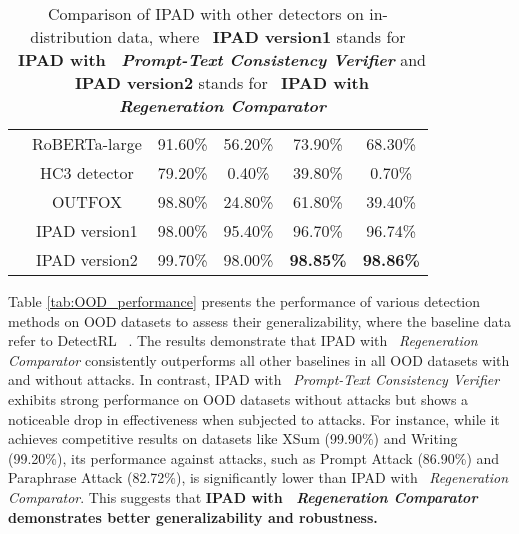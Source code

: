 \begin{table}[ht!]
{\begin{tabular}{cccccc}
      & RoBERTa-large & 91.60\% & 56.20\% & 73.90\% & 68.30\% \\
      & HC3 detector & 79.20\% & 0.40\% & 39.80\% & 0.70\% \\
      & OUTFOX & 98.80\% & 24.80\% & 61.80\% & 39.40\% \\
      & IPAD version1 & 98.00\% & 95.40\% & 96.70\% & 96.74\%\\
      & IPAD version2& 99.70\% & 98.00\% & \textbf{98.85\%} & \textbf{98.86\%} \\
      \hline
    \end{tabular}
    }
  \caption{Comparison of IPAD with other detectors on in-distribution data, where ~\textbf{IPAD version1} stands for ~\textbf{IPAD with ~\textit{Prompt-Text Consistency Verifier}} and ~\textbf{IPAD version2} stands for ~\textbf{IPAD with ~\textit{Regeneration Comparator}}}
  \label{tab:performance_metrics_detection}
\end{table}

Table \ref{tab:OOD_performance} presents the performance of various detection methods on OOD datasets to assess their generalizability, where the baseline data refer to DetectRL ~\cite{r58}.  The results demonstrate that IPAD with ~\textit{Regeneration Comparator} consistently outperforms all other baselines in all OOD datasets with and without attacks. In contrast, IPAD with ~\textit{Prompt-Text Consistency Verifier} exhibits strong performance on OOD datasets without attacks but shows a noticeable drop in effectiveness when subjected to attacks. For instance, while it achieves competitive results on datasets like XSum (99.90\%) and Writing (99.20\%), its performance against attacks, such as Prompt Attack (86.90\%) and Paraphrase Attack (82.72\%), is significantly lower than IPAD with ~\textit{Regeneration Comparator}. This suggests that \textbf{IPAD with ~\textit{Regeneration Comparator} demonstrates better generalizability and robustness.}

